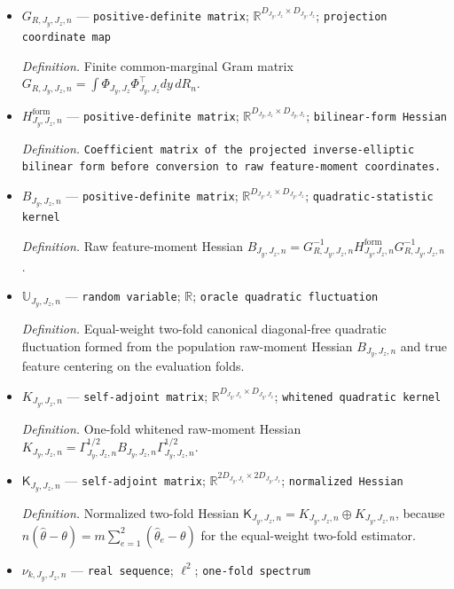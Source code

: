 \documentclass{article}
\begin{document}
\begin{itemize}
  \item \(G_{R,J_y,J_z,n}\) --- \texttt{positive-\allowbreak{}definite matrix}; \(\mathbb R^{D_{J_y,J_z}\times D_{J_y,J_z}}\); \texttt{projection coordinate map}
  \par\smallskip\noindent\emph{Definition.} Finite common-marginal Gram matrix \(G_{R,J_y,J_z,n}=\int\Phi_{J_y,J_z}\Phi_{J_y,J_z}^{\top}dy\,dR_n\).
  \item \(H^{\mathrm{form}}_{J_y,J_z,n}\) --- \texttt{positive-\allowbreak{}definite matrix}; \(\mathbb R^{D_{J_y,J_z}\times D_{J_y,J_z}}\); \texttt{bilinear-\allowbreak{}form Hessian}
  \par\smallskip\noindent\emph{Definition.} \texttt{Coefficient matrix of the projected inverse-\allowbreak{}elliptic bilinear form before conversion to raw feature-\allowbreak{}moment coordinates.}
  \item \(B_{J_y,J_z,n}\) --- \texttt{positive-\allowbreak{}definite matrix}; \(\mathbb R^{D_{J_y,J_z}\times D_{J_y,J_z}}\); \texttt{quadratic-\allowbreak{}statistic kernel}
  \par\smallskip\noindent\emph{Definition.} Raw feature-moment Hessian \(B_{J_y,J_z,n}=G_{R,J_y,J_z,n}^{-1}H^{\mathrm{form}}_{J_y,J_z,n}G_{R,J_y,J_z,n}^{-1}\).
  \item \(\mathbb U_{J_y,J_z,n}\) --- \texttt{random variable}; \(\mathbb R\); \texttt{oracle quadratic fluctuation}
  \par\smallskip\noindent\emph{Definition.} Equal-weight two-fold canonical diagonal-free quadratic fluctuation formed from the population raw-moment Hessian \(B_{J_y,J_z,n}\) and true feature centering on the evaluation folds.
  \item \(K_{J_y,J_z,n}\) --- \texttt{self-\allowbreak{}adjoint matrix}; \(\mathbb R^{D_{J_y,J_z}\times D_{J_y,J_z}}\); \texttt{whitened quadratic kernel}
  \par\smallskip\noindent\emph{Definition.} One-fold whitened raw-moment Hessian \(K_{J_y,J_z,n}=\Gamma_{J_y,J_z,n}^{1/2}B_{J_y,J_z,n}\Gamma_{J_y,J_z,n}^{1/2}\).
  \item \(\mathsf K_{J_y,J_z,n}\) --- \texttt{self-\allowbreak{}adjoint matrix}; \(\mathbb R^{2D_{J_y,J_z}\times2D_{J_y,J_z}}\); \texttt{normalized Hessian}
  \par\smallskip\noindent\emph{Definition.} Normalized two-fold Hessian \(\mathsf K_{J_y,J_z,n}=K_{J_y,J_z,n}\oplus K_{J_y,J_z,n}\), because \(n(\widehat\theta-\theta)=m\sum_{e=1}^2(\widehat\theta_e-\theta)\) for the equal-weight two-fold estimator.
  \item \(\nu_{k,J_y,J_z,n}\) --- \texttt{real sequence}; \(\ell^2\); \texttt{one-\allowbreak{}fold spectrum}

\end{itemize}
\end{document}
